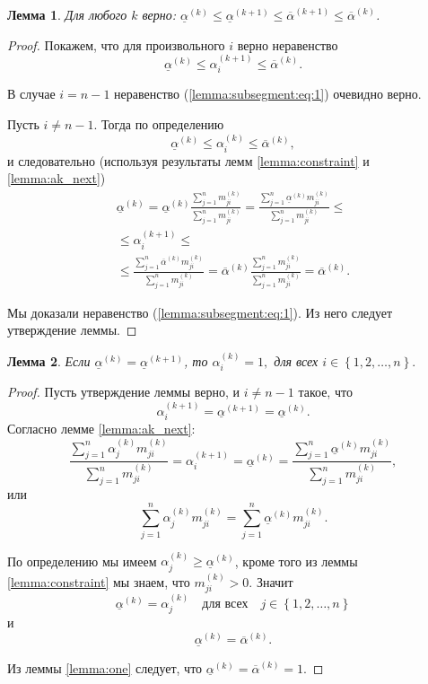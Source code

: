 \documentclass{article}
\newtheorem{lemma}{Лемма}
\newcommand{\ak}[1][k]{\alpha^{(#1)}}
\newcommand{\minak}[1][k]{\underline{\alpha}^{(#1)}}
\newcommand{\maxak}[1][k]{\overline{\alpha}^{(#1)}}
\newcommand{\mk}[1][k]{m^{(#1)}}
\begin{document}
\begin{lemma}
  \label{lemma:subsegment}
  Для любого $k$ верно: $\minak \leq \minak[k + 1] \leq \maxak[k + 1] \leq \maxak[k]$.
\end{lemma}
\begin{proof}
  Покажем, что для произвольного $i$ верно неравенство
  \begin{equation}
    \label{lemma:subsegment:eq:1}
    \minak \leq \ak[k + 1]_i \leq \maxak.
  \end{equation}

  В случае $i = n - 1$ неравенство (\ref{lemma:subsegment:eq:1}) очевидно верно.

  Пусть $i \not= n - 1$. Тогда по определению
  \[ \minak \leq \ak_i \leq \maxak, \]
  и следовательно (используя результаты лемм \ref{lemma:constraint} и \ref{lemma:ak_next})
  \begin{gather*} 
     \minak = \minak\frac{\sum_{j = 1}^n{\mk_{ji}}}{\sum_{j = 1}^n{\mk_{ji}}} = \frac{\sum_{j = 1}^n{\minak\mk_{ji}}}{\sum_{j = 1}^n{\mk_{ji}}} \leq \\
     \leq \ak[k + 1]_i \leq \\
     \leq \frac{\sum_{j = 1}^n{\maxak\mk_{ji}}}{\sum_{j = 1}^n{\mk_{ji}}} = \maxak\frac{\sum_{j = 1}^n{\mk_{ji}}}{\sum_{j = 1}^n{\mk_{ji}}} = \maxak.
  \end{gather*}

  Мы доказали неравенство (\ref{lemma:subsegment:eq:1}). Из него следует утверждение леммы.
\end{proof}

\begin{lemma}
  \label{lemma:final}
  Если $\minak = \minak[k + 1]$, то $\ak_i = 1,$ для всех $i \in \left\{ 1, 2, \ldots, n \right\}.$
\end{lemma}
\begin{proof}
  Пусть утверждение леммы верно, и $i \not= n - 1$ такое, что
  \[ \ak[k + 1]_i = \minak[k + 1] = \minak. \]
  Согласно лемме \ref{lemma:ak_next}:
  \[ \frac{\sum_{j = 1}^n{\ak_j\mk_{ji}}}{\sum_{j = 1}^n{\mk_{ji}}} = \ak[k + 1]_i = \minak = \frac{\sum_{j = 1}^n{\minak\mk_{ji}}}{\sum_{j = 1}^n{\mk_{ji}}}, \]
  или
  \[ \sum_{j = 1}^n{\ak_j\mk_{ji}} = \sum_{j = 1}^n{\minak\mk_{ji}}. \]

  По определению мы имеем $\ak_j \geq \minak$, кроме того из леммы \ref{lemma:constraint} мы знаем, что $\mk_{ji} > 0$. Значит
  \[ \minak = \ak_j \quad \text{для всех} \quad j \in \left\{ 1, 2, \ldots, n \right\} \]
  и
  \[ \minak = \maxak. \]

  Из леммы \ref{lemma:one} следует, что $\minak = \maxak = 1$.
\end{proof}
\end{document}
